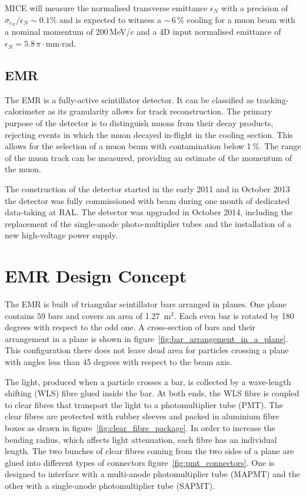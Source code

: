 \documentclass[a4paper,11pt]{article}
\begin{document}
MICE will measure the normalised transverse emittance $\epsilon_N$ with a precision of $\sigma_{\epsilon_N}/\epsilon_N \sim 0.1 \%$ and is
expected to witness a $\sim\,$6\,\% cooling for a muon beam with a nominal momentum of 200\,MeV/$c$ and a 4D input normalised emittance of
$\epsilon_N = 5.8$\,$\pi\cdot$mm$\cdot$rad.

\subsection{EMR}
The EMR is a fully-active scintillator detector. It can be classified as tracking-calorimeter as its granularity allows for track
reconstruction. The primary purpose of the detector is to distinguish muons from their decay products, rejecting events in which
the muon decayed in-flight in the cooling section.  This allows for the selection of a muon beam with contamination
below 1\,\%. The range of the muon track can be measured, providing an estimate of the momentum of the muon. 

The construction of the detector started in the early 2011 and in October 2013 the detector was fully commissioned with beam
during one month of dedicated data-taking at RAL. The detector was upgraded in October 2014, including the replacement of the single-anode
photo-multiplier tubes and the installation of a new high-voltage power supply.

\section{EMR Design Concept}
The EMR is built of triangular scintillator bars arranged in planes. One plane contains 59 bars and covers an area of 1.27~m$^2$. Each even
bar is rotated by 180 degrees with respect to the odd one. A cross-section of bars and their arrangement in a plane is shown in
figure~\ref{fig:bar_arrangement_in_a_plane}. This configuration there does not leave dead area for particles crossing a plane with angles
less than 45 degrees with respect to the beam axis.

The light, produced when a particle crosses a bar, is collected by a wave-length shifting (WLS) fibre glued inside the bar. At both ends, the
WLS fibre is coupled to clear fibres that transport the light to a photomultiplier tube (PMT). The clear fibres are protected with rubber sleeves
and packed in aluminium fibre boxes as drawn in figure~\ref{fig:clear_fibre_package}. In order to increase the bending radius, which affects light
attenuation, each fibre has an individual length. The two bunches of clear fibres coming from the two sides of a plane are glued into different
types of connectors figure~\ref{fig:pmt_connectors}. One is designed to interface with a multi-anode photomultiplier tube (MAPMT) and the other
with a single-anode photomultiplier tube (SAPMT).
\end{document}
